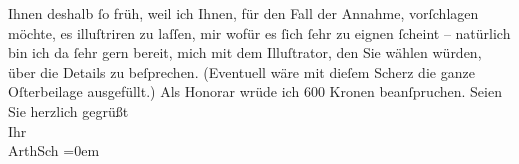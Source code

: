 \begin{ledgroupsized}[t]{13cm}
               Ihnen deshalb ſo früh, weil ich Ihnen, für {\pb}den Fall der Annahme, vorſchlagen
               möchte, es illuſtriren zu laſſen, \introOben{}mir\introOben{} wofür es ſich ſehr zu eignen ſcheint
               – natürlich bin ich da{\geminationn} ſehr gern bereit,  mich mit dem Illuſtrator, den Sie wählen würden,
               über die Details zu beſprechen. (Eventuell wäre mit dieſem Scherz die ganze Oſterbeilage ausgefüllt.) Als Honorar wrüde ich 600 Kronen
               beanſpruchen. \pend
           \pstart
           Seien Sie herzlich gegrüßt {\\[\baselineskip]}Ihr {\\[\baselineskip]}\spacefill\mbox{ArthSch}\pend
           \leftskip=0em{}
         
         \endnumbering{}\end{ledgroupsized}\begin{anhang}\end{anhang}\newcommand{\dateiname}{L02997}\newcommand{\titel}{Arthur Schnitzler an Felix Salten, 8. 2. 1905}\newcommand{\editorInnen}{Martin Anton Müller und Laura Untner}
      